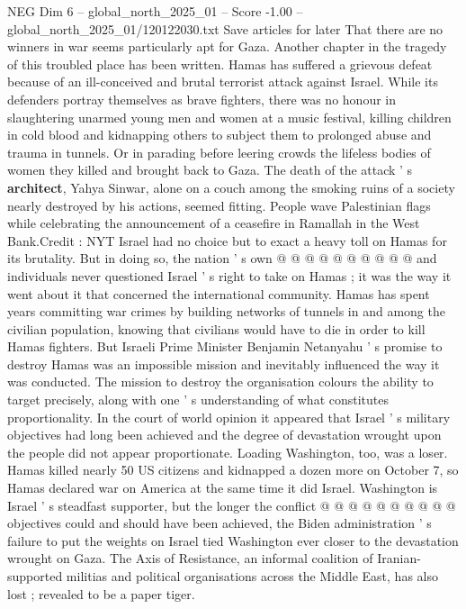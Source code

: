 \begin{textsample}{NEG Dim 6 – global\_north\_2025\_01 – Score -1.00 – global\_north\_2025\_01/120122030.txt}  \label{ex:f6_neg_096}
Save articles for later That there are no winners in war seems particularly apt for Gaza.
Another chapter in the tragedy of this troubled place has been written.
Hamas has suffered a grievous defeat because of an ill-conceived and brutal terrorist attack against Israel.
While its defenders portray themselves as brave fighters, there was no honour in slaughtering unarmed young men and women at a music festival, killing children in cold blood and kidnapping others to subject them to prolonged abuse and trauma in tunnels.
Or in parading before leering crowds the lifeless bodies of women they killed and brought back to Gaza.
The death of the attack ' s \textbf{architect}, Yahya Sinwar, alone on a couch among the smoking ruins of a society nearly destroyed by his actions, seemed fitting.
People wave Palestinian flags while celebrating the announcement of a ceasefire in Ramallah in the West Bank.Credit : NYT Israel had no choice but to exact a heavy toll on Hamas for its brutality.
But in doing so, the nation ' s own @ @ @ @ @ @ @ @ @ @ and individuals never questioned Israel ' s right to take on Hamas ; it was the way it went about it that concerned the international community.
Hamas has spent years committing war crimes by building networks of tunnels in and among the civilian population, knowing that civilians would have to die in order to kill Hamas fighters.
But Israeli Prime Minister Benjamin Netanyahu ' s promise to destroy Hamas was an impossible mission and inevitably influenced the way it was conducted.
The mission to destroy the organisation colours the ability to target precisely, along with one ' s understanding of what constitutes proportionality.
In the court of world opinion it appeared that Israel ' s military objectives had long been achieved and the degree of devastation wrought upon the people did not appear proportionate.
Loading Washington, too, was a loser.
Hamas killed nearly 50 US citizens and kidnapped a dozen more on October 7, so Hamas declared war on America at the same time it did Israel.
Washington is Israel ' s steadfast supporter, but the longer the conflict @ @ @ @ @ @ @ @ @ @ objectives could and should have been achieved, the Biden administration ' s failure to put the weights on Israel tied Washington ever closer to the devastation wrought on Gaza.
The Axis of Resistance, an informal coalition of Iranian-supported militias and political organisations across the Middle East, has also lost ; revealed to be a paper tiger.

\end{textsample}
